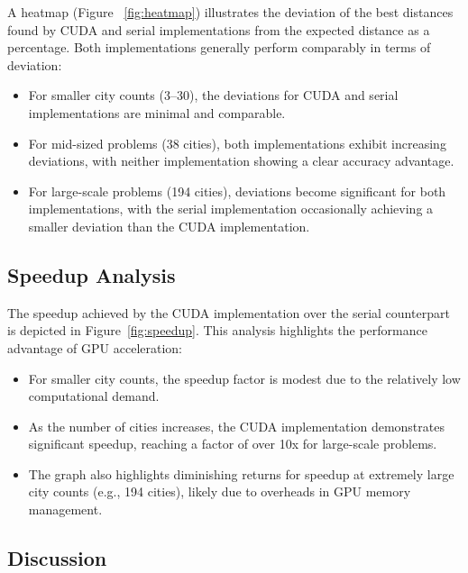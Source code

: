 \documentclass[conference]{IEEEtran}
\begin{document}
A heatmap (Figure ~\ref{fig:heatmap}) illustrates the deviation of the best distances found by CUDA and serial implementations from the expected distance as a percentage. Both implementations generally perform comparably in terms of deviation:
    \begin{itemize}
        \item For smaller city counts (3–30), the deviations for CUDA and serial implementations are minimal and comparable.
        \item For mid-sized problems (38 cities), both implementations exhibit increasing deviations, with neither implementation showing a clear accuracy advantage.
        \item For large-scale problems (194 cities), deviations become significant for both implementations, with the serial implementation occasionally achieving a smaller deviation than the CUDA implementation.
    \end{itemize}

\subsection{Speedup Analysis}



The speedup achieved by the CUDA implementation over the serial counterpart is depicted in Figure~\ref{fig:speedup}. This analysis highlights the performance advantage of GPU acceleration:
    \begin{itemize}
        \item For smaller city counts, the speedup factor is modest due to the relatively low computational demand.
        \item As the number of cities increases, the CUDA implementation demonstrates significant speedup, reaching a factor of over 10x for large-scale problems.
        \item The graph also highlights diminishing returns for speedup at extremely large city counts (e.g., 194 cities), likely due to overheads in GPU memory management.
    \end{itemize}


\subsection{Discussion}
\end{document}

